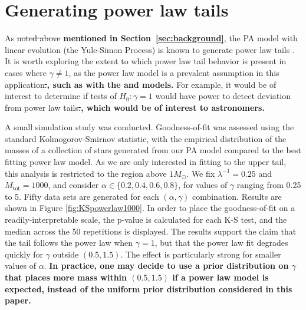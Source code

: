 \documentclass[ejs]{imsart}
\numberwithin{equation}{section}
\theoremstyle{plain}
\newcommand{\new}[1]{{\bf #1}}
\newcommand{\remove}[1]{\st{#1}}
\newcommand{\Msun}{M_{\odot}}
\newcommand{\Mtot}{M_{\text{tot}}}
\begin{document}
\appendix


\section{Generating power law tails} \label{sec:powerlaw}

As \remove{noted above} \new{mentioned in Section~\ref{sec:background}}, the PA model with linear evolution (the Yule-Simon Process) is 
known to generate power law tails \citep{newman2005}.
It is worth exploring the extent to which power law tail behavior is present 
in cases where $\gamma \neq 1$, as the power law model is a prevalent
assumption in this application\remove{.}\new{,  such as with the \cite{kroupa2001} and \cite{Chabrier:2003oq, Chabrier:2003om} models.}
For example, it would be of interest to determine
if tests of $H_0\!:\gamma = 1$ would have power to detect deviation from
power law tails\remove{.}\new{, which would be of interest to astronomers.}

A small simulation study was conducted. Goodness-of-fit was assessed using the
standard Kolmogorov-Smirnov statistic, with the empirical distribution
of the masses of a collection of stars generated 
from our PA model compared to the best fitting power law model.
As we are only interested in fitting to the upper tail, this analysis 
is restricted to the region above $1 \Msun$. We fix $\lambda^{-1} = 0.25$
and $\Mtot = 1000$, and consider $\alpha \in \{0.2,0.4,0.6,0.8\}$, for
values of $\gamma$ ranging from 0.25 to 5. Fifty data sets are generated
for each $(\alpha, \gamma)$ combination. Results are shown in Figure \ref{fig:KSpowerlaw1000}.
In order to place the goodness-of-fit on a readily-interpretable scale, the p-value
is calculated for each K-S test, and the median across the 50 repetitions is displayed.
The results support the claim that the tail follows the power law when $\gamma = 1$, but that
the power law fit degrades quickly for $\gamma$ outside $(0.5, 1.5)$. The effect is particularly
strong for smaller values of $\alpha$. \new{In practice, one may decide to use a prior distribution on $\gamma$ that places more mass within
$(0.5, 1.5)$ if a power law model is expected, instead of the uniform prior distribution considered in this paper.} 
\end{document}
